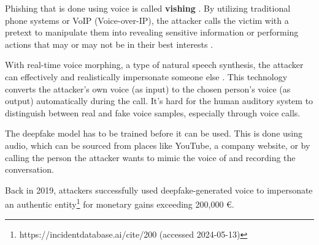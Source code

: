 Phishing that is done using voice is called \textbf{vishing} \citep{salahdineSocialEngineeringAttacks2019}. By utilizing traditional phone systems or VoIP (Voice-over-IP), the attacker calls the victim with a pretext to manipulate them into revealing sensitive information or performing actions that may or may not be in their best interests \citep{hadnagySocialEngineering2018}.



With real-time voice morphing, a type of natural speech synthesis, the attacker can effectively and realistically impersonate someone else \citep{doanBTSEAudioDeepfakeDetectiong2023}. This technology converts the attacker's own voice (as input) to the chosen person's voice (as output) automatically during the call. It's hard for the human auditory system to distinguish between real and fake voice samples, especially through voice calls.

The deepfake model has to be trained before it can be used. This is done using audio, which can be sourced from places like YouTube, a company website, or by calling the person the attacker wants to mimic the voice of and recording the conversation.


Back in 2019, attackers successfully used deepfake-generated voice to impersonate an authentic entity\footnote{https://incidentdatabase.ai/cite/200 (accessed 2024-05-13)} for monetary gains exceeding 200,000 €.












